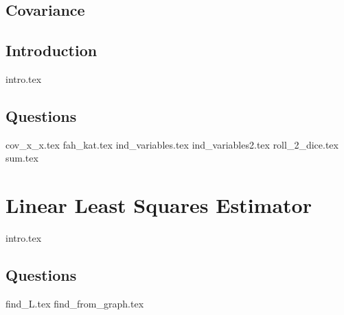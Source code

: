 \documentclass{exam}
\begin{document}
\subsection{Covariance}
\subsection{Introduction}
{intro.tex}
\subsection{Questions}
\begin{questions}
{cov_x_x.tex}
{fah_kat.tex}
{ind_variables.tex}
{ind_variables2.tex}
{roll_2_dice.tex}
{sum.tex}
\end{questions}

\section{Linear Least Squares Estimator}
{intro.tex}
\subsection{Questions}
\begin{questions}
{find_L.tex}
{find_from_graph.tex}
\end{questions}
\end{document}
